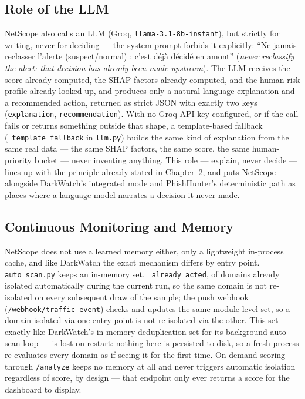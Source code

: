 \documentclass[12pt,a4paper]{report}
\begin{document}
\subsection*{Role of the LLM}
NetScope also calls an LLM (Groq, \texttt{llama-3.1-8b-instant}), but strictly for writing, never for deciding --- the system prompt forbids it explicitly: ``Ne jamais reclasser l'alerte (suspect/normal) : c'est déjà décidé en amont'' (\emph{never reclassify the alert: that decision has already been made upstream}). The LLM receives the score already computed, the SHAP factors already computed, and the human risk profile already looked up, and produces only a natural-language explanation and a recommended action, returned as strict JSON with exactly two keys (\texttt{explanation}, \texttt{recommendation}). With no Groq API key configured, or if the call fails or returns something outside that shape, a template-based fallback (\texttt{\_template\_fallback} in \texttt{llm.py}) builds the same kind of explanation from the same real data --- the same SHAP factors, the same score, the same human-priority bucket --- never inventing anything. This role --- explain, never decide --- lines up with the principle already stated in Chapter~2, and puts NetScope alongside DarkWatch's integrated mode and PhishHunter's deterministic path as places where a language model narrates a decision it never made.

\subsection*{Continuous Monitoring and Memory}
NetScope does not use a learned memory either, only a lightweight in-process cache, and like DarkWatch the exact mechanism differs by entry point. \texttt{auto\_scan.py} keeps an in-memory set, \texttt{\_already\_acted}, of domains already isolated automatically during the current run, so the same domain is not re-isolated on every subsequent draw of the sample; the push webhook (\texttt{/webhook/traffic-event}) checks and updates the same module-level set, so a domain isolated via one entry point is not re-isolated via the other. This set --- exactly like DarkWatch's in-memory deduplication set for its background auto-scan loop --- is lost on restart: nothing here is persisted to disk, so a fresh process re-evaluates every domain as if seeing it for the first time. On-demand scoring through \texttt{/analyze} keeps no memory at all and never triggers automatic isolation regardless of score, by design --- that endpoint only ever returns a score for the dashboard to display.
\end{document}
